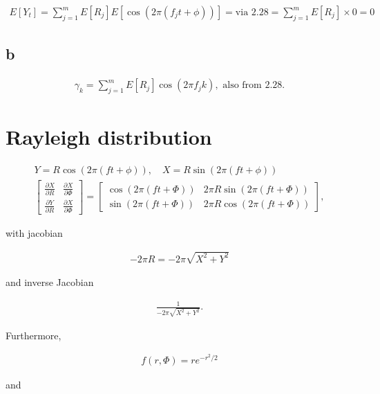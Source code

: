\documentclass[]{book}
\begin{document}
\begin{gather*}
  E[Y_t] = \sum_{j=1}^m E[R_j]E[\cos{(2\pi(f_j t+\phi))}] = \text{via 2.28} = \sum_{j=1}^m E[R_j] \times 0 = 0
\end{gather*}

\subsection*{b}\label{b-20}

\begin{gather*}
  \gamma_k = \sum_{j=1}^m E[R_j]\cos{(2\pi f_jk)}, \text{ also from 2.28.}
\end{gather*}

\section{Rayleigh distribution}\label{rayleigh-distribution}

\begin{gather*}
  Y = R\cos{(2\pi(ft + \phi))}, \quad X = R\sin{(2\pi(ft+\phi))}\\
  \begin{bmatrix}
    \frac{\partial X}{\partial R} & \frac{\partial X}{\partial \Phi} \\
    \frac{\partial Y}{\partial R} & \frac{\partial X}{\partial \Phi}
  \end{bmatrix} = 
  \begin{bmatrix}
    \cos{(2\pi(ft + \Phi))} & 2\pi R \sin{(2\pi(ft + \Phi))} \\
    \sin{(2\pi(ft + \Phi))} & 2\pi R \cos{(2\pi(ft + \Phi))}
  \end{bmatrix},
\end{gather*}

with jacobian

\begin{gather*}
  -2\pi R = -2\pi \sqrt{X^2 + Y^2}
\end{gather*}

and inverse Jacobian

\begin{gather*}
  \frac{1}{-2\pi \sqrt{X^2 + Y^2}}.
\end{gather*}

Furthermore,

\begin{gather*}
  f(r,\Phi) = re^{-r^2/2}
\end{gather*}

and
\end{document}
